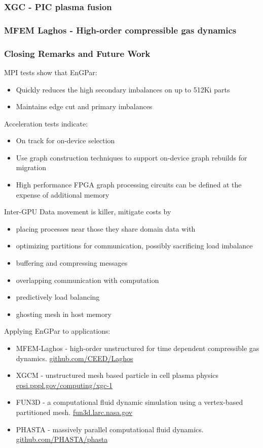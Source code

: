 \documentclass[aspectratio=169]{beamer}
\begin{document}
\begin{frame}
  \frametitle{XGC - PIC plasma fusion}
\end{frame}

\begin{frame}
  \frametitle{MFEM Laghos - High-order compressible gas dynamics}
\end{frame}

\begin{frame}
  \frametitle{Closing Remarks and Future Work}
  MPI tests show that EnGPar:
  \begin{itemize}
    \item Quickly reduces the high secondary imbalances on up to 512Ki parts
    \item Maintains edge cut and primary imbalances
  \end{itemize}
  Acceleration tests indicate:
  \begin{itemize}
    \item On track for on-device selection
    \item Use graph construction techniques to support on-device graph rebuilds for migration
    \item High performance FPGA graph processing circuits can be defined at the expense of additional memory
  \end{itemize}
  Inter-GPU Data movement is killer, mitigate costs by
  \begin{itemize}
    \item placing processes near those they share domain data with
    \item optimizing partitions for communication, possibly sacrificing load imbalance
    \item buffering and compressing messages
    \item overlapping communication with computation
    \item predictively load balancing
    \item ghosting mesh in host memory
  \end{itemize}
  Applying EnGPar to applications:
  \begin{itemize}
    \item MFEM-Laghos - high-order unstructured for time dependent compressible gas dynamics. \url{github.com/CEED/Laghos}
    \item XGCM - unstructured mesh based particle in cell plasma physics \url{epsi.pppl.gov/computing/xgc-1}
    \item FUN3D - a computational fluid dynamic simulation using a vertex-based partitioned mesh. \url{fun3d.larc.nasa.gov}
    \item PHASTA - massively parallel computational fluid dynamics. \url{github.com/PHASTA/phasta}
  \end{itemize}
\end{frame}
\end{document}
